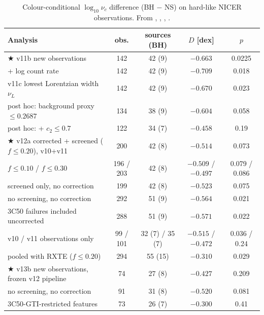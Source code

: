 \begin{table}[htbp]
\centering\small
\caption[Characteristic frequency, prospective]{Colour-conditional $\log_{10}\nu_c$ difference (BH $-$ NS) on hard-like NICER observations.
From , , ,
.}
\label{tab:p6nuc}
\footnotesize\setlength{\tabcolsep}{3.5pt}
\begin{tabular}{@{}>{\raggedright\arraybackslash}p{7.0cm}cccc@{}}
\toprule
Analysis & obs. & sources (BH) & $D$ [dex] & $p$ \\
\midrule
$\bigstar$ v11b new observations & 142 & 42 (9) & $-0.663$ & 0.0225 \\
\quad + log count rate & 142 & 42 (9) & $-0.709$ & 0.018 \\
\quad v11c lowest Lorentzian width $\nu_L$ & 142 & 42 (9) & $-0.670$ & 0.023 \\
\quad post hoc: background proxy $\le0.2687$ & 134 & 38 (9) & $-0.604$ & 0.058 \\
\quad post hoc: + $c_2\le0.7$ & 122 & 34 (7) & $-0.458$ & 0.19 \\
$\bigstar$ v12a corrected + screened ($f\le0.20$), v10+v11 & 200 & 42 (8) & $-0.514$ & 0.073 \\
\quad $f\le0.10$ / $f\le0.30$ & 196 / 203 & 42 (8) & $-0.509$ / $-0.497$ & 0.079 / 0.086 \\
\quad screened only, no correction & 199 & 42 (8) & $-0.523$ & 0.075 \\
\quad no screening, no correction & 292 & 51 (9) & $-0.564$ & 0.021 \\
\quad 3C50 failures included uncorrected & 288 & 51 (9) & $-0.571$ & 0.022 \\
\quad v10 / v11 observations only & 99 / 101 & 32 (7) / 35 (7) & $-0.515$ / $-0.472$ & 0.036 / 0.24 \\
\quad pooled with RXTE ($f\le0.20$) & 294 & 55 (15) & $-0.310$ & 0.029 \\
$\bigstar$ v13b new observations, frozen v12 pipeline & 74 & 27 (8) & $-0.427$ & 0.209 \\
\quad no screening, no correction & 91 & 31 (8) & $-0.520$ & 0.081 \\
\quad 3C50-GTI-restricted features & 73 & 26 (7) & $-0.300$ & 0.41 \\
\bottomrule
\end{tabular}
\end{table}


